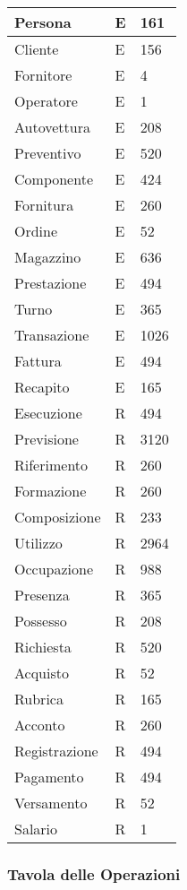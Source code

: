 \begin{longtable}{| p{4cm} | p{4cm} | p{4cm} |}
				Persona			& E & 161\\ \hline
				Cliente 		& E & 156\\ \hline
				Fornitore 		& E & 4\\ \hline
				Operatore 		& E & 1\\ \hline
				Autovettura 	& E & 208\\ \hline
				Preventivo		& E & 520\\ \hline
				Componente		& E & 424\\ \hline
				Fornitura 		& E & 260\\ \hline
				Ordine			& E & 52 \\ \hline
				Magazzino 		& E & 636\\ \hline
				Prestazione 	& E & 494\\ \hline
				Turno 			& E & 365\\ \hline
				Transazione 	& E & 1026 \\ \hline
				Fattura 		& E & 494\\ \hline
				Recapito		& E & 165\\ \hline
				Esecuzione		& R & 494\\ \hline
				Previsione		& R & 3120 \\ \hline
				Riferimento 	& R & 260\\ \hline
				Formazione		& R & 260\\ \hline
				Composizione	& R & 233\\ \hline
				Utilizzo		& R & 2964 \\ \hline
				Occupazione 	& R & 988\\ \hline
				Presenza		& R & 365\\ \hline
				Possesso		& R & 208\\ \hline
				Richiesta 		& R & 520\\ \hline
				Acquisto		& R & 52 \\ \hline
				Rubrica			& R & 165\\ \hline
				Acconto 		& R & 260\\ \hline
				Registrazione 	& R & 494\\ \hline
				Pagamento 		& R & 494\\ \hline
				Versamento		& R & 52 \\ \hline
				Salario 		& R & 1\\ \hline
				
			\end{longtable}
			
		\subsubsection{Tavola delle Operazioni}
		
